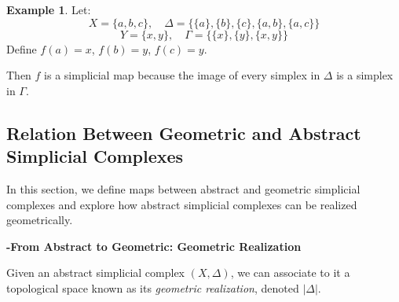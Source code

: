 \documentclass[11pt]{article}
\theoremstyle{definition}
\newtheorem{example}[definition]{Example}
\theoremstyle{plain}
\begin{document}
\begin{example}
    Let:
    \[
        X = \{a, b, c\}, \quad \Delta = \{\{a\}, \{b\}, \{c\}, \{a,b\}, \{a,c\}\}
    \]
    \[
        Y = \{x, y\}, \quad \Gamma = \{\{x\}, \{y\}, \{x,y\}\}
    \]
    Define $f(a) = x$, $f(b) = y$, $f(c) = y$.

    Then $f$ is a simplicial map because the image of every simplex in $\Delta$ is a simplex in $\Gamma$.

    \begin{center}
    \end{center}

\end{example}






\subsection{Relation Between Geometric and Abstract Simplicial Complexes}

In this section, we define maps between abstract and geometric simplicial complexes and explore how abstract simplicial complexes can be realized geometrically.

\textbf{-From Abstract to Geometric: Geometric Realization}

Given an abstract simplicial complex $(X, \Delta)$, we can associate to it a topological space known as its \emph{geometric realization}, denoted $|\Delta|$.
\end{document}
